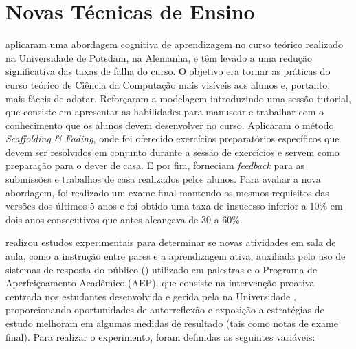 \section{Novas Técnicas de Ensino}

 aplicaram uma abordagem cognitiva de aprendizagem no curso teórico realizado na Universidade de Potsdam, na Alemanha, e têm levado a uma redução significativa das taxas de falha do curso. O objetivo era tornar as práticas do curso teórico de Ciência da Computação mais visíveis aos alunos e, portanto, mais fáceis de adotar. Reforçaram a modelagem introduzindo uma sessão tutorial, que consiste em apresentar as habilidades para manusear e trabalhar com o conhecimento que os alunos devem desenvolver no curso. Aplicaram o método \textit{Scaffolding \& Fading}, onde foi oferecido exercícios preparatórios específicos que devem ser resolvidos em conjunto durante a sessão de exercícios e servem como preparação para o dever de casa. E por fim, forneciam \textit{feedback} para as submissões e trabalhos de casa realizados pelos alunos. Para avaliar a nova abordagem, foi realizado um exame final mantendo os mesmos requisitos das versões dos últimos 5 anos e foi obtido uma taxa de insucesso inferior a 10\% em dois anos consecutivos que antes alcançava de 30 a 60\%.

 realizou estudos experimentais para determinar se novas atividades em sala de aula, como a instrução entre pares e a aprendizagem ativa, auxiliada pelo uso de sistemas de resposta do público () utilizado em palestras e o Programa de Aperfeiçoamento Acadêmico (AEP), que consiste na intervenção proativa centrada nos estudantes desenvolvida e gerida pela  na Universidade , proporcionando oportunidades de autorreflexão e exposição a estratégias de estudo melhoram em algumas medidas de resultado (tais como notas de exame final). Para realizar o experimento, foram definidas as seguintes variáveis:

